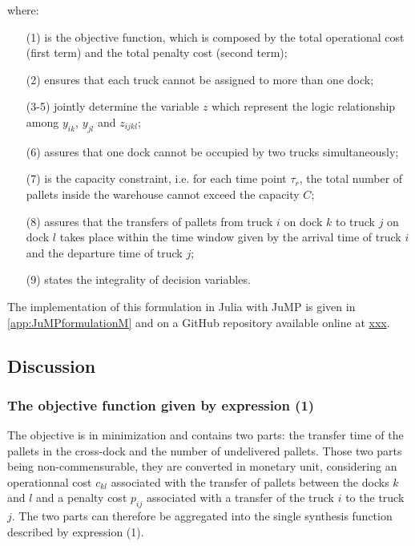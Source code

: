 \documentclass[preprint,12pt,authoryear]{elsarticle}
\begin{document}
\medskip
\noindent
where:
\begin{itemize}
    \item [(1)] is the objective function, which is composed by the total operational cost (first term) and the total penalty cost (second term);
    \item [(2)] ensures that each truck cannot be assigned to more than one dock;     
    \item [(3-5)] jointly determine the variable $z$ which represent the logic relationship among $y_{ik}$, $y_{jl}$ and $z_{ijkl}$;
    \item [(6)] assures that one dock cannot be occupied by two trucks simultaneously;
    \item [(7)] is the capacity constraint, i.e. for each time point $\tau_r$, the total number of pallets inside the warehouse cannot exceed the capacity $C$;
    \item [(8)] assures that the transfers of pallets from truck $i$ on dock $k$ to truck $j$ on dock $l$ takes place within the time window given by the arrival time of truck $i$ and the departure time of truck $j$;
    \item [(9)] states the integrality of decision variables. 
\end{itemize}
\medskip
The implementation of this formulation in Julia with JuMP is given in \ref{app:JuMPformulationM} and on a GitHub repository available online at \color{red}\url{xxx}\color{black}.

%
%
\subsection{Discussion}\label{sec:discussionM}
\smallskip

%
%
\subsubsection{The objective function given by expression (1)}

The objective is in minimization and contains two parts: the transfer time of the pallets in the cross-dock and the number of undelivered pallets. Those two parts being non-commensurable, they are converted in monetary unit, considering an operationnal cost $c_{kl}$ associated with the transfer of pallets between the docks $k$ and $l$ and a penalty cost $p_{ij}$ associated with a transfer of the truck $i$ to the truck $j$. The two parts can therefore be aggregated into the single synthesis function described by expression (1).
\end{document}
